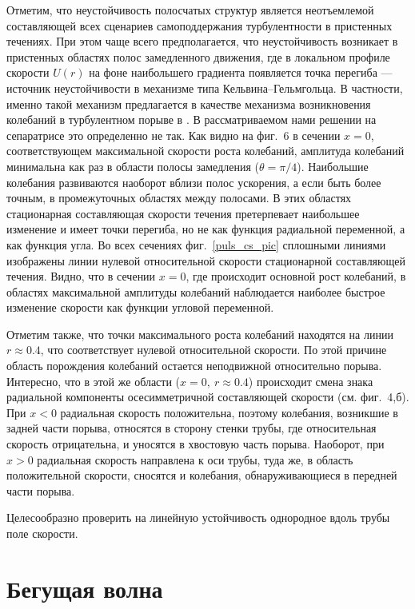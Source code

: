 Отметим, что неустойчивость полосчатых структур является неотъемлемой составляющей всех сценариев самоподдержания турбулентности в пристенных течениях. При этом чаще всего предполагается, что неустойчивость возникает в пристенных областях полос замедленного движения, где в локальном профиле скорости $U(r)$ на фоне наибольшего градиента появляется точка перегиба --- источник неустойчивости в механизме типа Кельвина--Гельмгольца. В частности, именно такой механизм предлагается в качестве механизма возникновения колебаний в турбулентном порыве в \cite{Shumizu2009}. В рассматриваемом нами решении на сепаратрисе это определенно не так. Как видно на фиг.~6 в сечении $x=0$, соответствующем максимальной скорости роста колебаний, амплитуда колебаний минимальна как раз в области полосы замедления ($\theta=\pi/4$). Наибольшие колебания развиваются наоборот вблизи полос ускорения, а если быть более точным, в промежуточных областях между полосами. В этих областях стационарная составляющая скорости течения претерпевает наибольшее изменение и имеет точки перегиба, но не как функция радиальной переменной, а как функция угла. Во всех сечениях фиг.~\ref{puls_cs_pic} сплошными линиями изображены линии нулевой относительной скорости стационарной составляющей течения. Видно, что в сечении $x=0$, где происходит основной рост колебаний, в областях максимальной амплитуды колебаний наблюдается наиболее быстрое изменение скорости как функции угловой переменной.

Отметим также, что точки максимального роста колебаний находятся на линии $r\approx0.4$, что соответствует нулевой относительной скорости. По этой причине область порождения колебаний остается неподвижной относительно порыва. Интересно, что в этой же области ($x=0,\ r\approx0.4$) происходит смена знака радиальной компоненты осесимметричной составляющей скорости (см. фиг.~4,б). При $x<0$ радиальная скорость положительна, поэтому колебания, возникшие в задней части порыва, относятся в сторону стенки трубы, где относительная скорость отрицательна, и уносятся в хвостовую часть порыва. Наоборот, при $x>0$ радиальная скорость направлена к оси трубы, туда же, в область положительной скорости, сносятся и колебания, обнаруживающиеся в передней части порыва.

Целесообразно проверить на линейную устойчивость однородное вдоль трубы поле скорости. 


\section{Бегущая волна}

